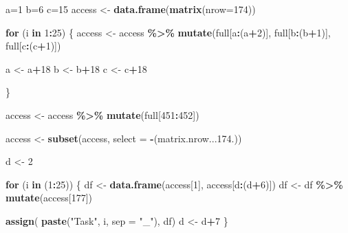 \documentclass[
]{article}
\newenvironment{Shaded}{\begin{snugshade}}{\end{snugshade}}
\newcommand{\AttributeTok}[1]{\textcolor[rgb]{0.13,0.29,0.53}{#1}}
\newcommand{\ControlFlowTok}[1]{\textcolor[rgb]{0.13,0.29,0.53}{\textbf{#1}}}
\newcommand{\DecValTok}[1]{\textcolor[rgb]{0.00,0.00,0.81}{#1}}
\newcommand{\FloatTok}[1]{\textcolor[rgb]{0.00,0.00,0.81}{#1}}
\newcommand{\FunctionTok}[1]{\textcolor[rgb]{0.13,0.29,0.53}{\textbf{#1}}}
\newcommand{\NormalTok}[1]{#1}
\newcommand{\OtherTok}[1]{\textcolor[rgb]{0.56,0.35,0.01}{#1}}
\newcommand{\SpecialCharTok}[1]{\textcolor[rgb]{0.81,0.36,0.00}{\textbf{#1}}}
\newcommand{\StringTok}[1]{\textcolor[rgb]{0.31,0.60,0.02}{#1}}
\begin{document}
\begin{Shaded}
\begin{Highlighting}[]
\NormalTok{a}\OtherTok{=}\DecValTok{1}
\NormalTok{b}\OtherTok{=}\DecValTok{6}
\NormalTok{c}\OtherTok{=}\DecValTok{15}
\NormalTok{access }\OtherTok{\textless{}{-}} \FunctionTok{data.frame}\NormalTok{(}\FunctionTok{matrix}\NormalTok{(}\AttributeTok{nrow=}\DecValTok{174}\NormalTok{))}

\ControlFlowTok{for}\NormalTok{ (i }\ControlFlowTok{in} \DecValTok{1}\SpecialCharTok{:}\DecValTok{25}\NormalTok{) \{}
\NormalTok{  access }\OtherTok{\textless{}{-}}\NormalTok{ access }\SpecialCharTok{\%\textgreater{}\%}
    \FunctionTok{mutate}\NormalTok{(full[a}\SpecialCharTok{:}\NormalTok{(a}\SpecialCharTok{+}\DecValTok{2}\NormalTok{)], full[b}\SpecialCharTok{:}\NormalTok{(b}\SpecialCharTok{+}\DecValTok{1}\NormalTok{)], full[c}\SpecialCharTok{:}\NormalTok{(c}\SpecialCharTok{+}\DecValTok{1}\NormalTok{)])}
  
\NormalTok{  a }\OtherTok{\textless{}{-}}\NormalTok{ a}\SpecialCharTok{+}\DecValTok{18}
\NormalTok{  b }\OtherTok{\textless{}{-}}\NormalTok{ b}\SpecialCharTok{+}\DecValTok{18}
\NormalTok{  c }\OtherTok{\textless{}{-}}\NormalTok{ c}\SpecialCharTok{+}\DecValTok{18}
  
\NormalTok{\}}

\NormalTok{access }\OtherTok{\textless{}{-}}\NormalTok{ access }\SpecialCharTok{\%\textgreater{}\%}
  \FunctionTok{mutate}\NormalTok{(full[}\DecValTok{451}\SpecialCharTok{:}\DecValTok{452}\NormalTok{])}

\NormalTok{access }\OtherTok{\textless{}{-}} \FunctionTok{subset}\NormalTok{(access, }\AttributeTok{select =} \SpecialCharTok{{-}}\NormalTok{(matrix.nrow...}\FloatTok{174.}\NormalTok{))}
\end{Highlighting}
\end{Shaded}

\begin{Shaded}
\begin{Highlighting}[]
\NormalTok{d }\OtherTok{\textless{}{-}} \DecValTok{2}

\ControlFlowTok{for}\NormalTok{ (i }\ControlFlowTok{in}\NormalTok{ (}\DecValTok{1}\SpecialCharTok{:}\DecValTok{25}\NormalTok{)) \{}
\NormalTok{  df }\OtherTok{\textless{}{-}} \FunctionTok{data.frame}\NormalTok{(access[}\DecValTok{1}\NormalTok{], access[d}\SpecialCharTok{:}\NormalTok{(d}\SpecialCharTok{+}\DecValTok{6}\NormalTok{)])}
\NormalTok{  df }\OtherTok{\textless{}{-}}\NormalTok{ df }\SpecialCharTok{\%\textgreater{}\%}
    \FunctionTok{mutate}\NormalTok{(access[}\DecValTok{177}\NormalTok{])}
  
  \FunctionTok{assign}\NormalTok{( }\FunctionTok{paste}\NormalTok{(}\StringTok{"Task"}\NormalTok{, i, }\AttributeTok{sep =} \StringTok{"\_"}\NormalTok{), df)}
\NormalTok{  d }\OtherTok{\textless{}{-}}\NormalTok{ d}\SpecialCharTok{+}\DecValTok{7}
\NormalTok{\}}
\end{Highlighting}
\end{Shaded}
\end{document}
